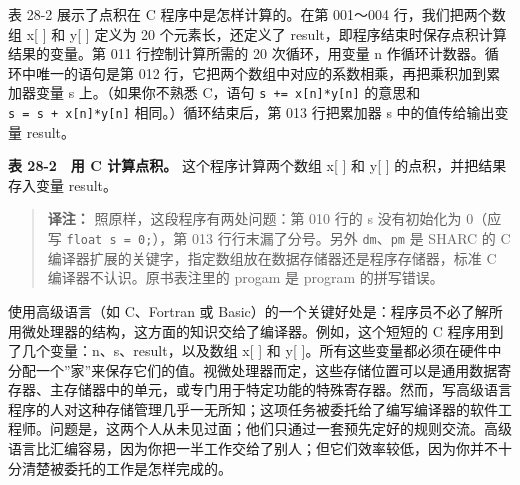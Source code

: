 表 28-2 展示了点积在 C 程序中是怎样计算的。在第 001～004
行，我们把两个数组 x{[} {]} 和 y{[} {]} 定义为 20 个元素长，还定义了
result，即程序结束时保存点积计算结果的变量。第 011 行控制计算所需的 20
次循环，用变量 n 作循环计数器。循环中唯一的语句是第 012
行，它把两个数组中对应的系数相乘，再把乘积加到累加器变量 s
上。（如果你不熟悉 C，语句 \texttt{s\ +=\ x{[}n{]}*y{[}n{]}} 的意思和
\texttt{s\ =\ s\ +\ x{[}n{]}*y{[}n{]}} 相同。）循环结束后，第 013
行把累加器 s 中的值传给输出变量 result。

\textbf{表 28-2　用 C 计算点积。} 这个程序计算两个数组 x{[} {]} 和 y{[}
{]} 的点积，并把结果存入变量 result。

\begin{Shaded}
\begin{Highlighting}[]
     \OperatorTok{[}\OperatorTok{];}
     \OperatorTok{[}\OperatorTok{];}
     \OperatorTok{;}
\OperatorTok{()}
   \OperatorTok{\{}
     \OperatorTok{;}
     \OperatorTok{;}
      \OperatorTok{(}\OperatorTok{=}\OperatorTok{;}\OperatorTok{\textless{}}\OperatorTok{;}\OperatorTok{++)}
\OperatorTok{+=}\OperatorTok{[}\OperatorTok{]*}\OperatorTok{[}\OperatorTok{];}
\OperatorTok{=}
   \OperatorTok{\}}
\end{Highlighting}
\end{Shaded}

\begin{quote}
\textbf{译注：} 照原样，这段程序有两处问题：第 010 行的 s 没有初始化为
0（应写 \texttt{float\ s\ =\ 0;}），第 013 行行末漏了分号。另外
\texttt{dm}、\texttt{pm} 是 SHARC 的 C
编译器扩展的关键字，指定数组放在数据存储器还是程序存储器，标准 C
编译器不认识。原书表注里的 progam 是 program 的拼写错误。
\end{quote}

使用高级语言（如 C、Fortran 或
Basic）的一个关键好处是：程序员不必了解所用微处理器的结构，这方面的知识交给了编译器。例如，这个短短的
C 程序用到了几个变量：n、s、result，以及数组 x{[} {]} 和 y{[}
{]}。所有这些变量都必须在硬件中分配一个''家''来保存它们的值。视微处理器而定，这些存储位置可以是通用数据寄存器、主存储器中的单元，或专门用于特定功能的特殊寄存器。然而，写高级语言程序的人对这种存储管理几乎一无所知；这项任务被委托给了编写编译器的软件工程师。问题是，这两个人从未见过面；他们只通过一套预先定好的规则交流。高级语言比汇编容易，因为你把一半工作交给了别人；但它们效率较低，因为你并不十分清楚被委托的工作是怎样完成的。

